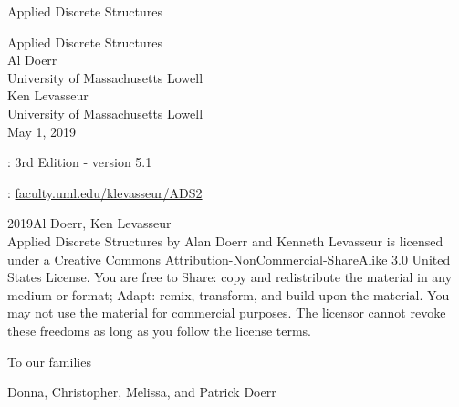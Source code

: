 \documentclass[twoside,10pt,]{book}
\numberwithin{equation}{section}
\begin{document}
\frontmatter
\thispagestyle{empty}
{\centering
\vspace*{0.28\textheight}
{\Huge Applied Discrete Structures}\\}
\clearpage
\thispagestyle{empty}
\null%
\clearpage
\thispagestyle{empty}
{\centering
\vspace*{0.14\textheight}
{\Huge Applied Discrete Structures}\\[3\baselineskip]
{\Large Al Doerr}\\[0.5\baselineskip]
{\Large University of Massachusetts Lowell}\\[3\baselineskip]
{\Large Ken Levasseur}\\[0.5\baselineskip]
{\Large University of Massachusetts Lowell}\\[3\baselineskip]
{\Large May 1, 2019}\\}
\clearpage
\thispagestyle{empty}
\hypertarget{colophon-1}{}
: 3rd Edition - version 5.1\par\medskip
{}: \href{http:\slash{}\slash{}faculty.uml.edu\slash{}klevasseur\slash{}ADS2}{faculty.uml.edu\slash{}klevasseur\slash{}ADS2}\par\medskip
\noindent\textcopyright{}2019\quad{}Al Doerr, Ken Levasseur\\[0.5\baselineskip]
Applied Discrete Structures by Alan Doerr and Kenneth Levasseur is licensed under a Creative Commons Attribution-NonCommercial-ShareAlike 3.0 United States License. You are free to Share: copy and redistribute the material in any medium or format; Adapt: remix, transform, and build upon the material. You may not use the material for commercial purposes.  The licensor cannot revoke these freedoms as long as you follow the license terms.\par\medskip
{}
\null\clearpage
\cleardoublepage
\thispagestyle{empty}
\begin{center}\Large%
To our families%
\end{center}
\begin{center}\Large%
Donna, Christopher, Melissa, and Patrick Doerr%
\end{center}
\end{document}
